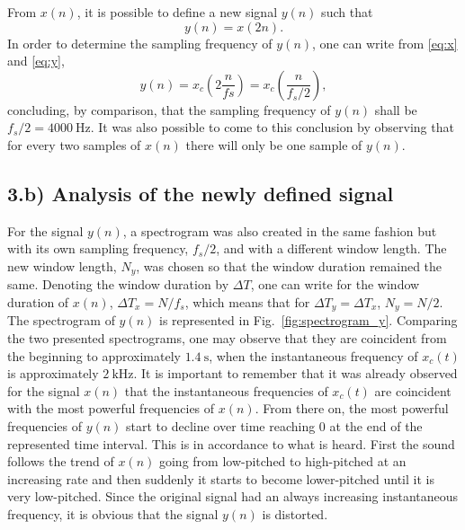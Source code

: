 \documentclass[a4paper, oneside, 11pt]{article}
\begin{document}
From $x(n)$, it is possible to define a new signal $y(n)$ such that
\begin{equation} \label{eq:y}
    y(n) = x(2 n).
\end{equation}
In order to determine the sampling frequency of $y(n)$, one can write from \eqref{eq:x} and \eqref{eq:y},
\begin{equation}
    y (n) = x_c \left (2 \frac{n}{fs} \right) = x_c \left (\frac{n}{f_s/2} \right),
\end{equation}
concluding, by comparison, that the sampling frequency of $y(n)$ shall be $f_s/2 = \SI{4000}{\hertz}$. It was also possible to come to this conclusion by observing that for every two samples of $x(n)$ there will only be one sample of $y(n)$.
    
\subsection{3.b) Analysis of the newly defined signal}

For the signal $y(n)$, a spectrogram was also created in the same fashion but with its own sampling frequency, $f_s/2$, and with a different window length. The new window length, $N_y$, was chosen so that the window duration remained the same. Denoting the window duration by $\Delta T$, one can write for the window duration of $x(n)$, $\Delta T_x = N / f_s$, which means that for $\Delta T_y = \Delta T_x$, $N_y = N/2$. The spectrogram of $y(n)$ is represented in Fig.~\ref{fig:spectrogram_y}. Comparing the two presented spectrograms, one may observe that they are coincident from the beginning to approximately $\SI{1.4}{\second}$, when the instantaneous frequency of $x_c(t)$ is approximately $\SI{2}{\kilo \hertz}$. It is important to remember that it was already observed for the signal $x(n)$ that the instantaneous frequencies of $x_c(t)$ are coincident with the most powerful frequencies of $x(n)$. From there on, the most powerful frequencies of $y(n)$ start to decline over time reaching 0 at the end of the represented time interval. This is in accordance to what is heard. First the sound follows the trend of $x(n)$ going from low-pitched to high-pitched at an increasing rate and then suddenly it starts to become lower-pitched until it is very low-pitched. Since the original signal had an always increasing instantaneous frequency, it is obvious that the signal $y(n)$ is distorted.
\end{document}
